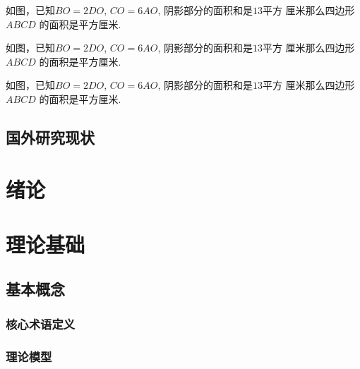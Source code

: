 \documentclass{USTBBook}
\begin{document}
\begin{question*}
  如图，已知$BO=2DO$, $CO=6AO$, 阴影部分的面积和是$13$平方
  厘米那么四边形 $ABCD$ 的面积是\fillin[]平方厘米.
\end{question*}

\begin{question*}
  如图，已知$BO=2DO$, $CO=6AO$, 阴影部分的面积和是$13$平方
  厘米那么四边形 $ABCD$ 的面积是\fillin[]平方厘米.
\end{question*}

\begin{question*}
  如图，已知$BO=2DO$, $CO=6AO$, 阴影部分的面积和是$13$平方
  厘米那么四边形 $ABCD$ 的面积是\fillin[]平方厘米.
\end{question*}

\newpage
\section*{国外研究现状}

\subsection{}
\zhlipsum[4]

\subsection{}
\zhlipsum[5]

\chapter{绪论}
\zhlipsum[1]

\chapter{理论基础}
\zhlipsum[6]

\section{基本概念}
\zhlipsum[7]

\subsection{核心术语定义}
\zhlipsum[8]

\subsection{理论模型}
\zhlipsum[9]
\end{document}
